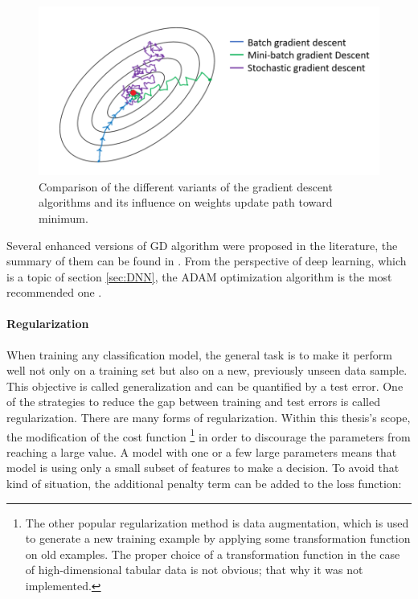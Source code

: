 
\begin{figure}[!h]
\centering
\includegraphics{figures/batch_descent.png}
\caption{Comparison of the different variants of the gradient descent algorithms and its influence on weights update path toward minimum.
\label{fig:Batch gradient decent}}
\end{figure}


Several enhanced versions of GD algorithm were proposed in the literature, the summary of them can be found in \cite{GradientDescent}. 
From the perspective of deep learning, which is a topic of section \ref{sec:DNN}, the ADAM optimization algorithm is the most recommended one \cite{ADAM}. 

\paragraph{Regularization} \mbox{}
\label{sec:regularization}
When training any classification model, the general task is to make it perform well not only on a training set but also on a new, previously unseen data sample. This objective is called generalization and can be quantified by a test error. One of the strategies to reduce the gap between training and test errors is called regularization. There are many forms of regularization. Within this thesis's scope, the modification of the cost function \footnote{The other popular regularization method is data augmentation, which is used to generate a new training example by applying some transformation function on old examples. The proper choice of a transformation function in the case of high-dimensional tabular data is not obvious; that why it was not implemented.} in order to discourage the parameters from reaching a large value. A model with one or a few large parameters means that model is using only a small subset of features to make a decision. To avoid that kind of situation, the additional penalty term can be added to the loss function: 

